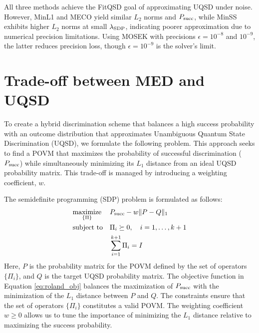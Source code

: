 


All three methods achieve the FitQSD goal of approximating UQSD under noise.
However, MinL1 and MECO yield similar $L_2$ norms and $P_{\mathrm{succ}}$, while
MinSS exhibits higher $L_2$ norms at small $\lambda_{\mathrm{SDP}}$, indicating
poorer approximation due to numerical precision limitations.
Using MOSEK with precisions $\epsilon = 10^{-8}$ and $10^{-9}$, the latter
reduces precision loss, though $\epsilon = 10^{-9}$ is the solver's limit.


\section{Trade-off between MED and UQSD}
To create a hybrid discrimination scheme that balances a high success
probability with an outcome distribution that approximates Unambiguous Quantum
State Discrimination (UQSD), we formulate the following problem.
This approach seeks to find a POVM that maximizes the probability of
successful discrimination ($P_{\mathrm{succ}}$) while simultaneously minimizing its
$L_1$ distance from an ideal UQSD probability matrix.
This trade-off is managed by introducing a weighting coefficient, $w$.

The semidefinite programming (SDP) problem is formulated as follows:
\begin{align}
    \label{eq:roland_obj}
     & \underset{\{\Pi\}}{\text{maximize}} &  & P_{\mathrm{succ}} - w \|P-Q\|_{1}                      \\
     & \text{subject to}                   &  & \Pi_{i} \succeq 0, \quad i = 1, \ldots, k+1 \\
     &                                     &  & \sum_{i=1}^{k+1} \Pi_i = I
\end{align}
Here, $P$ is the probability matrix for the POVM defined by the set of
operators $\{\Pi_i\}$, and $Q$ is the target UQSD probability matrix.
The objective function in Equation \ref{eq:roland_obj} balances the
maximization of $P_{\mathrm{succ}}$ with the minimization of the $L_1$ distance between $P$ and $Q$.
The constraints ensure that the set of operators $\{\Pi_i\}$ constitutes a valid POVM.
The weighting coefficient $w \geq 0$ allows us to tune the importance of
minimizing the $L_1$ distance relative to maximizing the success probability.


